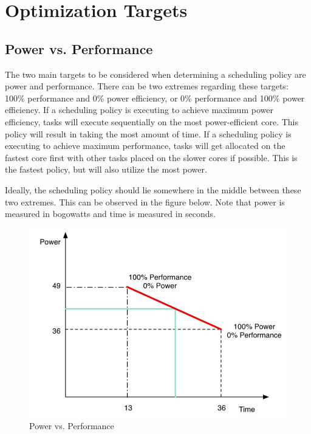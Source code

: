 \section{Optimization Targets}
\subsection{Power vs. Performance}
The two main targets to be considered when determining a scheduling policy are power and performance. There can be two extremes regarding these targets: 100\% performance and 0\% power efficiency, or 0\% performance and 100\% power efficiency. If a scheduling policy is executing to achieve maximum power efficiency, tasks will execute sequentially on the most power-efficient core. This policy will result in taking the most amount of time. If a scheduling policy is executing to achieve maximum performance, tasks will get allocated on the fastest core first with other tasks placed on the slower cores if possible. This is the fastest policy, but will also utilize the most power. \cite{AAP2013}

Ideally, the scheduling policy should lie somewhere in the middle between these two extremes. \cite{AAP2013} This can be observed in the figure below. Note that power is measured in bogowatts and time is measured in seconds.
\begin{figure}[h]
	\includegraphics[width=\textwidth]{images/power_vs_performance.jpg}
	\caption{Power vs. Performance \cite{AAP2013}}
\end{figure}